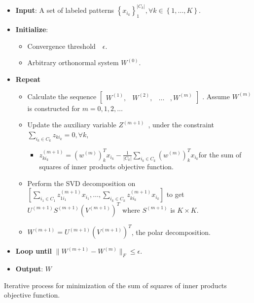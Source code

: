 \begin{algorithm}[H]
\begin{itemize}
\item \textbf{Input}: A set of labeled patterns $\left\{ x_{i_{k}}\right\} _{1}^{|C_{k}|},\forall k\in\left\{ 1,\ldots,K\right\} $.
\item \textbf{Initialize}:
\begin{itemize}
\item Convergence threshold~~$\epsilon$.
\item Arbitrary orthonormal system $W^{\left(0\right)}$.
\end{itemize}
\item \textbf{Repeat}
\begin{itemize}
\item Calculate the sequence $\left[\begin{array}{cccc}
W^{\left(1\right)}, & W^{\left(2\right)}, & \ldots & ,W^{\left(m\right)}\end{array}\right]$ . Assume $W^{\left(m\right)}$ is constructed for $m=0,1,2,\ldots$
\item Update the auxiliary variable $Z^{(m+1)}$~, under the constraint
~$\sum_{i_{k}\in C_{k}}z_{ki_{k}}=0,\forall k$,
\begin{itemize}
\item $z_{ki_{k}}^{(m+1)}=\left(w^{(m)}\right)_{k}^{T}x_{i_{k}}-\frac{1}{|C_{k}|}\sum_{i_{k}\in C_{k}}\left(w^{(m)}\right)_{k}^{T}x_{i_{k}}$for
the sum of squares of inner products objective function.
\end{itemize}
\item Perform the SVD decomposition on $\left[\sum_{i_{1}\in C_{1}}z_{1i_{1}}^{(m+1)}x_{i_{1}},\ldots,\sum_{i_{k}\in C_{k}}z_{ki_{k}}^{(m+1)}x_{i_{k}}\right]$
to get $U^{(m+1)}S^{(m+1)}\left(V^{(m+1)}\right)^{T}$ where $S^{(m+1)}$
is $K\times K$. 
\item $W^{(m+1)}=U^{(m+1)}\left(V^{(m+1)}\right)^{T}$, the polar decomposition.
\end{itemize}
\item \textbf{Loop until} $\|W^{(m+1)}-W^{(m)}\|_{F}\leq\epsilon$.
\item \textbf{Output}: $W$
\end{itemize}
\caption{Iterative process for minimization of the sum of squares of inner
products objective function. \label{alg:Iterative-Process}}
\end{algorithm}

